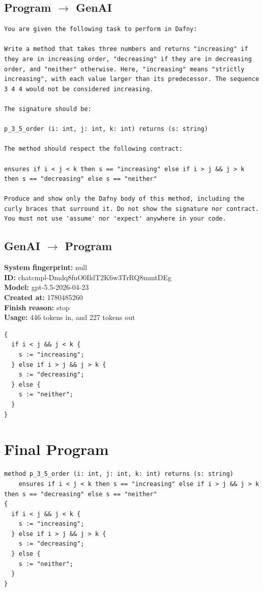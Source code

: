 \documentclass{article}
\begin{document}
\subsection*{Program $\rightarrow$ GenAI}
\begin{lstlisting}
You are given the following task to perform in Dafny:

Write a method that takes three numbers and returns "increasing" if they are in increasing order, "decreasing" if they are in decreasing order, and "neither" otherwise. Here, "increasing" means "strictly increasing", with each value larger than its predecessor. The sequence 3 4 4 would not be considered increasing.

The signature should be:

p_3_5_order (i: int, j: int, k: int) returns (s: string)

The method should respect the following contract:

ensures if i < j < k then s == "increasing" else if i > j && j > k then s == "decreasing" else s == "neither"

Produce and show only the Dafny body of this method, including the curly braces that surround it. Do not show the signature nor contract. You must not use 'assume' nor 'expect' anywhere in your code.
\end{lstlisting}
\subsection*{GenAI $\rightarrow$ Program}
\textbf{System fingerprint: }null
\\\textbf{ID: }chatcmpl-Dmdq8fnO0IldT2K6w3TrRQ8mmtDEg
\\\textbf{Model: }gpt-5.5-2026-04-23
\\\textbf{Created at: }1780485260
\\\textbf{Finish reason: }stop
\\\textbf{Usage: }446 tokens in, and 227 tokens out
\begin{lstlisting}
{
  if i < j && j < k {
    s := "increasing";
  } else if i > j && j > k {
    s := "decreasing";
  } else {
    s := "neither";
  }
}
\end{lstlisting}
\section*{Final Program}
\begin{lstlisting}
method p_3_5_order (i: int, j: int, k: int) returns (s: string)
	ensures if i < j < k then s == "increasing" else if i > j && j > k then s == "decreasing" else s == "neither"
{
  if i < j && j < k {
    s := "increasing";
  } else if i > j && j > k {
    s := "decreasing";
  } else {
    s := "neither";
  }
}
\end{lstlisting}
\end{document}
